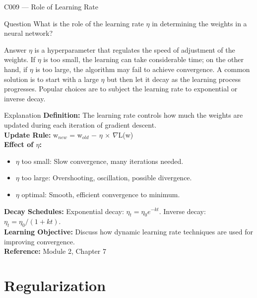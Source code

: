 \documentclass[aspectratio=169,8pt]{beamer}
\begin{document}
	\begin{frame}{C009 --- Role of Learning Rate}
		\begin{block}{Question}
			What is the role of the learning rate $\eta$ in determining the weights in a neural network?
		\end{block}
		\begin{block}{Answer}
			$\eta$ is a hyperparameter that regulates the speed of adjustment of the weights. If $\eta$ is too small, the learning can take considerable time; on the other hand, if $\eta$ is too large, the algorithm may fail to achieve convergence. A common solution is to start with a large $\eta$ but then let it decay as the learning process progresses. Popular choices are to subject the learning rate to exponential or inverse decay.
		\end{block}
		\begin{block}{Explanation}
			\textbf{Definition:} The learning rate controls how much the weights are updated during each iteration of gradient descent.\\
			\textbf{Update Rule:} w$_{new}$ = w$_{old}$ $-$ $\eta$ $\times$ $\nabla$L(w)\\
			\textbf{Effect of $\eta$:} \\
			\begin{itemize}
				\item $\eta$ too small: Slow convergence, many iterations needed.
				\item $\eta$ too large: Overshooting, oscillation, possible divergence.
				\item $\eta$ optimal: Smooth, efficient convergence to minimum.
			\end{itemize}
			\textbf{Decay Schedules:} Exponential decay: $\eta_t = \eta_0 e^{-kt}$. Inverse decay: $\eta_t = \eta_0 / (1+kt)$.\\
			\textbf{Learning Objective:} Discuss how dynamic learning rate techniques are used for improving convergence.\\
			\textbf{Reference:} Module 2, Chapter 7
		\end{block}
	\end{frame}
	
	\section{Regularization}
	
\end{document}
